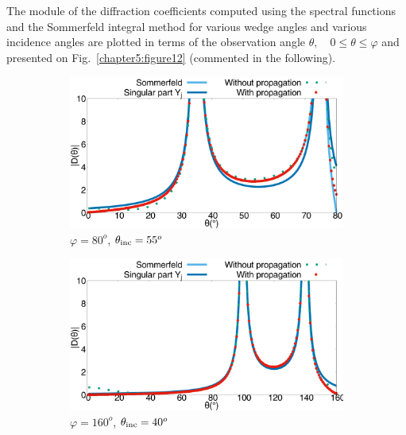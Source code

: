 The module of the diffraction coefficients computed using the spectral functions and the Sommerfeld integral method for various wedge angles and various incidence angles are plotted in terms of the observation angle $\theta, \quad 0\leq \theta\leq \varphi$ and presented on Fig.~\ref{chapter5:figure12} (commented in the following). 
\begin{figure}[h!]
\centering
\begin{subfigure}[b]{0.49\textwidth}
        \includegraphics[width=\textwidth]{images/chapter2/Figure8a.pdf}
        \caption{$\varphi = 80^o$, $\theta_{\rm inc} = 55^o$}
        \label{chapter5:figure12a}
    \end{subfigure}
\begin{subfigure}[b]{0.49\textwidth}
        \includegraphics[width=\textwidth]{images/chapter2/Figure8b.pdf}
        \caption{$\varphi = 160^o$, $\theta_{\rm inc} = 40^o$}
        \label{chapter5:figure12b}
    \end{subfigure}
\\
~\\
\begin{subfigure}[b]{0.49\textwidth}

\end{subfigure}
\end{figure}
